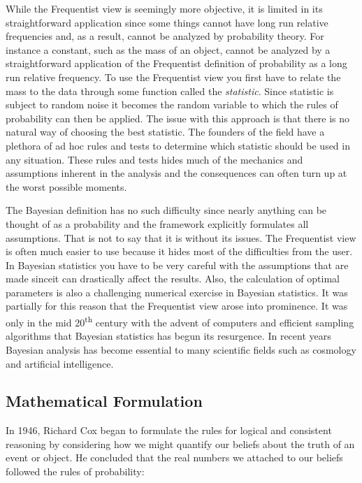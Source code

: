 \documentclass[12pt]{article}
\numberwithin{equation}{section}
\begin{document}
While the Frequentist view is seemingly more objective, it is limited in its straightforward application since some things cannot have long run relative frequencies and, as a result, cannot be analyzed by probability theory. For instance a constant, such as the mass of an object, cannot be analyzed by a straightforward application of the Frequentist definition of probability as a long run relative frequency. To use the Frequentist view you first have to relate the mass to the data through some function called the \emph{statistic}. Since statistic is subject to random noise it becomes the random variable to which the rules of probability can then be applied. The issue with this approach is that there is no natural way of choosing the best statistic.\cite{sivia2006data} The founders of the field have a plethora of ad hoc rules and tests to determine which statistic should be used in any situation. These rules and tests hides much of the mechanics and assumptions inherent in the analysis and the consequences can often turn up at the worst possible moments.

The Bayesian definition has no such difficulty since nearly anything can be thought of as a probability and the framework explicitly formulates all assumptions. That is not to say that it is without its issues. The Frequentist view is often much easier to use because it hides most of the difficulties from the user. In Bayesian statistics you have to be very careful with the assumptions that are made sinceit can drastically affect the results. Also, the calculation of optimal parameters is also a challenging numerical exercise in Bayesian statistics. It was partially for this reason that the Frequentist view arose into prominence. It was only in the mid 20\textsuperscript{th} century with the advent of computers and efficient sampling algorithms that Bayesian statistics has begun its resurgence. In recent years Bayesian analysis has become essential to many scientific fields such as cosmology and artificial intelligence.\cite{von2011bayesian}

\subsection{Mathematical Formulation}
In 1946, Richard Cox began to formulate the rules for logical and consistent reasoning by considering how we might quantify our beliefs about the truth of an event or object. He concluded that the real numbers we attached to our beliefs followed the rules of probability:\cite{sivia2006data} 
\end{document}

